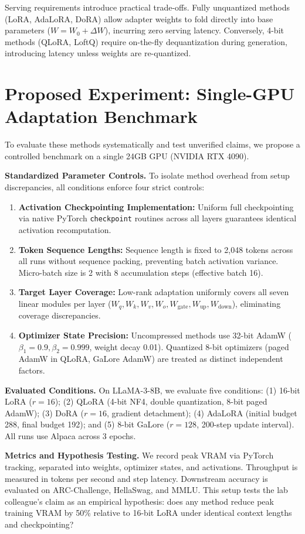 \documentclass[11pt,a4paper]{article}
\begin{document}
Serving requirements introduce practical trade-offs. Fully unquantized methods (LoRA, AdaLoRA, DoRA) allow adapter weights to fold directly into base parameters ($W = W_0 + \Delta W$), incurring zero serving latency. Conversely, 4-bit methods (QLoRA, LoftQ) require on-the-fly dequantization during generation, introducing latency unless weights are re-quantized.

\section{Proposed Experiment: Single-GPU Adaptation Benchmark}
To evaluate these methods systematically and test unverified claims, we propose a controlled benchmark on a single 24GB GPU (NVIDIA RTX 4090).

\textbf{Standardized Parameter Controls.} To isolate method overhead from setup discrepancies, all conditions enforce four strict controls:
\begin{enumerate}
    \item \textbf{Activation Checkpointing Implementation:} Uniform full checkpointing via native PyTorch \texttt{checkpoint} routines across all layers guarantees identical activation recomputation.
    \item \textbf{Token Sequence Lengths:} Sequence length is fixed to 2,048 tokens across all runs without sequence packing, preventing batch activation variance. Micro-batch size is 2 with 8 accumulation steps (effective batch 16).
    \item \textbf{Target Layer Coverage:} Low-rank adaptation uniformly covers all seven linear modules per layer ($W_q, W_k, W_v, W_o, W_{\text{gate}}, W_{\text{up}}, W_{\text{down}}$), eliminating coverage discrepancies.
    \item \textbf{Optimizer State Precision:} Uncompressed methods use 32-bit AdamW ($\beta_1=0.9, \beta_2=0.999$, weight decay 0.01). Quantized 8-bit optimizers (paged AdamW in QLoRA, GaLore AdamW) are treated as distinct independent factors.
\end{enumerate}

\textbf{Evaluated Conditions.} On LLaMA-3-8B, we evaluate five conditions: (1) 16-bit LoRA ($r=16$); (2) QLoRA (4-bit NF4, double quantization, 8-bit paged AdamW); (3) DoRA ($r=16$, gradient detachment); (4) AdaLoRA (initial budget 288, final budget 192); and (5) 8-bit GaLore ($r=128$, 200-step update interval). All runs use Alpaca across 3 epochs.

\textbf{Metrics and Hypothesis Testing.} We record peak VRAM via PyTorch tracking, separated into weights, optimizer states, and activations. Throughput is measured in tokens per second and step latency. Downstream accuracy is evaluated on ARC-Challenge, HellaSwag, and MMLU. This setup tests the lab colleague's claim as an empirical hypothesis: does any method reduce peak training VRAM by 50\% relative to 16-bit LoRA under identical context lengths and checkpointing?
\end{document}
